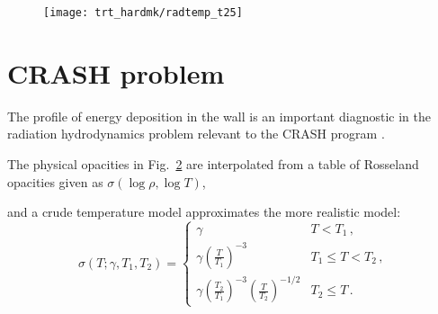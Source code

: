 \begin{figure}[htb]
  \centering
  \hspace{-1in}%
  \texttt{[image: trt\_hardmk/radtemp\_t25]}
  \label{fig:hardmkConvergence}
\end{figure}

\clearpage
\section{CRASH problem}
The profile of energy deposition in the wall is an important diagnostic in the
radiation hydrodynamics problem relevant to the CRASH program \cite{HolCom2011}.

The physical opacities in Fig.~\ref{fig:seriousOpacity} are interpolated from a
table of Rosseland opacities given as $\sigma(\log \rho, \log T)$, 
%
\begin{figure}[htb]
  \centering\small
  
  \label{fig:seriousOpacity}
\end{figure}
%
and a crude temperature model approximates the more realistic model:
\begin{equation*}
  \sigma(T;\gamma,T_1,T_2) =
  \begin{cases}
    \gamma   & T < T_1\,, \\
    \gamma \left( \frac{T}{T_1} \right)^{-3}   & T_1 \le T < T_2\,, \\
    \gamma \left( \frac{T_2}{T_1} \right)^{-3}
    \left( \frac{T}{T_2} \right)^{-1/2}   & T_2 \le T \,.
  \end{cases}
\end{equation*}


